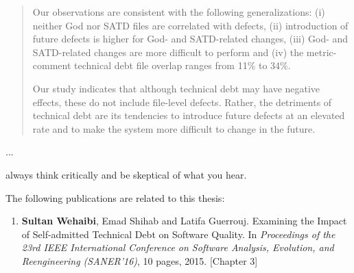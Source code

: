 \documentclass[12pt]{report}
\begin{document}
\begin{abstract}
Our observations are consistent with the following generalizations: (i) neither God nor SATD files are correlated with defects, (ii) introduction of future defects is higher for God- and SATD-related changes, (iii) God- and SATD-related changes are more difficult to perform and (iv) the metric-comment technical debt file overlap ranges from 11\% to 34\%.

Our study indicates that although technical debt may have negative effects, these do not include file-level defects. Rather, the detriments of technical debt are its tendencies to introduce future defects at an elevated rate and to make the system more difficult to change in the future.



\end{abstract}



\begin{acknowledgments}

...

\end{acknowledgments}




\begin{dedication}
	\begin{flushright}
	always think critically and be skeptical of what you hear.\\
	\end{flushright}
\end{dedication}

\begin{publications}

The following publications are related to this thesis:

\begin{enumerate}

\item \textbf{Sultan Wehaibi}, Emad Shihab and Latifa Guerrouj. Examining the Impact of Self-admitted Technical Debt on Software Quality. In \textit{Proceedings of the 23rd IEEE International Conference on Software Analysis, Evolution, and Reengineering (SANER’16)}, 10 pages, 2015. [Chapter 3]


\end{enumerate}

\end{publications}
\end{document}
